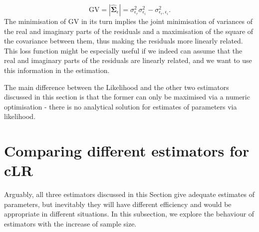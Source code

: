 \documentclass[
]{book}
\begin{document}
\begin{equation}
    \mathrm{GV} = |\hat{\boldsymbol{\Sigma}}_\epsilon| = \sigma_{\epsilon_r}^2 \sigma_{\epsilon_i}^2 - \sigma_{\epsilon_r, \epsilon_i}^2 .
    \label{eq:additiveLogLikConcentratedGV}
\end{equation}
The minimisation of GV in its turn implies the joint minimisation of variances of the real and imaginary parts of the residuals and a maximisation of the square of the covariance between them, thus making the residuals more linearly related. This loss function might be especially useful if we indeed can assume that the real and imaginary parts of the residuals are linearly related, and we want to use this information in the estimation.

The main difference between the Likelihood and the other two estimators discussed in this section is that the former can only be maximised via a numeric optimisation - there is no analytical solution for estimates of parameters via likelihood.

\hypertarget{SCLREstimatorsComparison}{%
\section{Comparing different estimators for cLR}\label{SCLREstimatorsComparison}}

Arguably, all three estimators discussed in this Section give adequate estimates of parameters, but inevitably they will have different efficiency and would be appropriate in different situations. In this subsection, we explore the behaviour of estimators with the increase of sample size.
\end{document}
